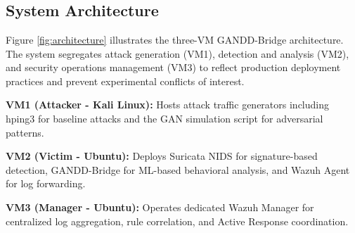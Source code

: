 \section{\chapterthree}

\subsection{System Architecture}

Figure \ref{fig:architecture} illustrates the three-VM GANDD-Bridge architecture. The system segregates attack generation (VM1), detection and analysis (VM2), and security operations management (VM3) to reflect production deployment practices and prevent experimental conflicts of interest.

\textbf{VM1 (Attacker - Kali Linux):} Hosts attack traffic generators including hping3 for baseline attacks and the GAN simulation script for adversarial patterns.

\textbf{VM2 (Victim - Ubuntu):} Deploys Suricata NIDS for signature-based detection, GANDD-Bridge for ML-based behavioral analysis, and Wazuh Agent for log forwarding.

\textbf{VM3 (Manager - Ubuntu):} Operates dedicated Wazuh Manager for centralized log aggregation, rule correlation, and Active Response coordination.


